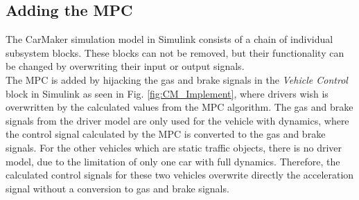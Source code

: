 \documentclass[letterpaper,10pt,conference]{ieeeconf}
\begin{document}
\subsection{Adding the MPC}
The CarMaker simulation model in Simulink consists of a chain of individual subsystem blocks. These blocks can not be removed, but their functionality can be changed by overwriting their input or output signals.\\ \indent
The MPC is added by hijacking the gas and brake signals in the \textit{Vehicle Control} block in Simulink as seen in Fig. \ref{fig:CM_Implement}, where drivers wish is overwritten by the calculated values from the MPC algorithm. The gas and brake signals from the driver model are only used for the vehicle with dynamics, where the control signal calculated by the MPC is converted to the gas and brake signals. For the other vehicles which are static traffic objects, there is no driver model, due to the limitation of only one car with full dynamics. Therefore, the calculated control signals for these two vehicles overwrite directly the acceleration signal without a conversion to gas and brake signals.

\end{document}
